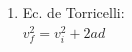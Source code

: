 \documentclass[letterpaper,11pt]{article}
\begin{document}
\begin{enumerate}
{\begin{multicols}{3}
\begin{enumerate}
        \columnbreak
        
        \item Ec. de Torricelli:\\
        $v_f^2 = v_i^2 + 2ad$
        
    \end{enumerate}
    \end{multicols}
    }

%   



\end{enumerate}
\end{document}

